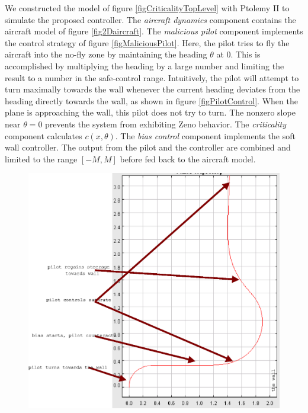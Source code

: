 \documentclass[11pt]{article}
\begin{document}
We constructed the model of figure \ref{figCriticalityTopLevel} with
Ptolemy II to simulate the proposed controller. The \emph{aircraft
dynamics} component contains the aircraft model of figure
\ref{fig2Daircraft}. The \emph{malicious pilot} component implements
the control strategy of figure \ref{figMaliciousPilot}. Here, the
pilot tries to fly the aircraft into the no-fly zone by maintaining
the heading $\theta$ at 0. This is accomplished by multiplying the
heading by a large number and limiting the result to a number in the
safe-control range.  Intuitively, the pilot will attempt to turn
maximally towards the wall whenever the current heading deviates from
the heading directly towards the wall, as shown in figure
\ref{figPilotControl}.  When the plane is approaching the wall, this
pilot does not try to turn.  The nonzero slope near $\theta = 0$
prevents the system from exhibiting Zeno behavior.  The
\emph{criticality} component calculates $c(x, \theta)$. The \emph{bias
control} component implements the soft wall controller. The output
from the pilot and the controller are combined and limited to the
range $[-M, M]$ before fed back to the aircraft model.

\begin{figure}[btp]
\centering
\includegraphics[width=5in]{simulationRun.eps}
\end{figure}
\end{document}
